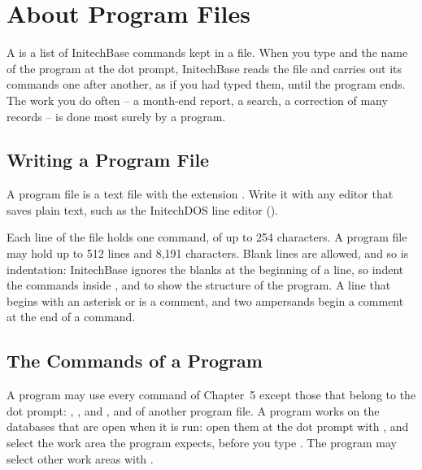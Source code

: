 \chapter{About Program Files}
A  is a list of InitechBase commands kept in a file.  When you
type  and the name of the program at the dot prompt, InitechBase reads
the file and carries out its commands one after another, as if you had typed
them, until the program ends.  The work you do often -- a month-end report, a
search, a correction of many records -- is done most surely by a program.

\section{Writing a Program File}
A program file is a text file with the extension .  Write it with
any editor that saves plain text, such as the InitechDOS line editor
 ().

Each line of the file holds one command, of up to 254 characters.  A program
file may hold up to 512 lines and 8,191 characters.  Blank lines are allowed,
and so is indentation: InitechBase ignores the blanks at the beginning of a
line, so indent the commands inside ,  and
 to show the structure of the program.  A line that begins with
an asterisk or  is a comment, and two ampersands begin a comment at
the end of a command.

\section{The Commands of a Program}
A program may use every command of Chapter~5 except those that belong to the
dot prompt: , ,  and , and  of
another program file.  A program works on the databases that are open when it
is run: open them at the dot prompt with , and select the work area
the program expects, before you type .  The program may select other
work areas with .

